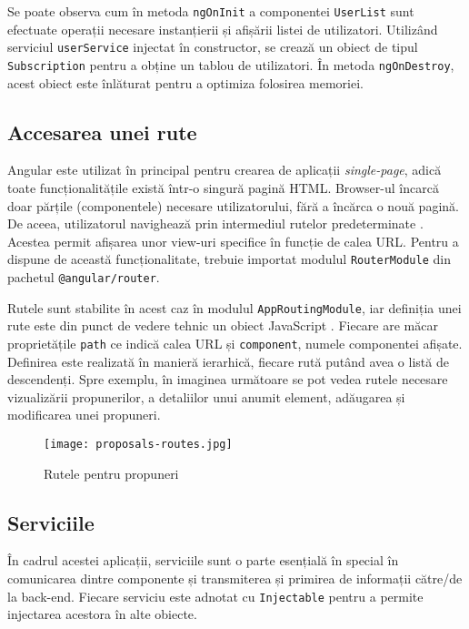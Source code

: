 Se poate observa cum în metoda \texttt{ngOnInit} a componentei \texttt{UserList} sunt efectuate operații necesare instanțierii și afișării listei de utilizatori. Utilizând serviciul \texttt{userService} injectat în constructor, se crează un obiect de tipul \texttt{Subscription} pentru a obține un tablou de utilizatori. În metoda \texttt{ngOnDestroy}, acest obiect este înlăturat pentru a optimiza folosirea memoriei.

\subsection{Accesarea unei rute}

Angular este utilizat în principal pentru crearea de aplicații \textit{single-page}, adică toate funcționalitățile există într-o singură pagină HTML. Browser-ul încarcă doar părțile (componentele) necesare utilizatorului, fără a încărca o nouă pagină. De aceea, utilizatorul navighează prin intermediul rutelor predeterminate \cite{angular-routes}. Acestea permit afișarea unor view-uri specifice în funcție de calea URL. Pentru a dispune de această funcționalitate, trebuie importat modulul \texttt{RouterModule} din pachetul \texttt{@angular/router}.

Rutele sunt stabilite în acest caz în modulul \texttt{AppRoutingModule}, iar definiția unei rute este din punct de vedere tehnic un obiect JavaScript \cite{angular-routes}. Fiecare are măcar proprietățile \texttt{path} ce indică calea URL și \texttt{component}, numele componentei afișate. Definirea este realizată în manieră ierarhică, fiecare rută putând avea o listă de descendenți. Spre exemplu, în imaginea următoare se pot vedea rutele necesare vizualizării propunerilor, a detaliilor unui anumit element, adăugarea și modificarea unei propuneri.

\begin{figure}[H]
	\centering
	\texttt{[image: proposals-routes.jpg]}
	\caption{Rutele pentru propuneri}
\end{figure}

\subsection{Serviciile}

În cadrul acestei aplicații, serviciile sunt o parte esențială în special în comunicarea dintre componente și transmiterea și primirea de informații către/de la back-end. Fiecare serviciu este adnotat cu \texttt{Injectable} pentru a permite injectarea acestora în alte obiecte.

